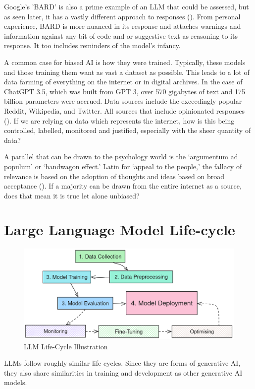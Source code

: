 \documentclass[12pt]{article}
\begin{document}
Google’s 'BARD' is also a prime example of an LLM that could be assessed, but as seen later, it has a vastly different approach to responses (\cite{pichai-2023}). From personal experience, BARD is more nuanced in its response and attaches warnings and information against any bit of code and or suggestive text as reasoning to its response. It too includes reminders of the model's infancy.

A common case for biased AI is how they were trained. Typically, these models and those training them want as vast a dataset as possible. This leads to a lot of data farming of everything on the internet or in digital archives. In the case of ChatGPT 3.5, which was built from GPT 3, over 570 gigabytes of text and 175 billion parameters were accrued. Data sources include the exceedingly popular Reddit, Wikipedia, and Twitter. All sources that include opinionated responses (\cite{gupta-2023}). If we are relying on data which represents the internet, how is this being controlled, labelled, monitored and justified, especially with the sheer quantity of data?

A parallel that can be drawn to the psychology world is the ‘argumentum ad populum’ or ‘bandwagon effect.’ Latin for ‘appeal to the people,’ the fallacy of relevance is based on the adoption of thoughts and ideas based on broad acceptance (\cite{ayala-2021}). If a majority can be drawn from the entire internet as a source, does that mean it is true let alone unbiased?

\newpage

\section{Large Language Model Life-cycle}

\begin{figure}[H]
    \centering
    \includegraphics[width=0.7\linewidth]{Images/LLM-LifeCycle(1).png}
    \caption{LLM Life-Cycle Illustration}
    \label{fig: LLM-LifeCycle}
\end{figure}

LLMs follow roughly similar life cycles. Since they are forms of generative AI, they also share similarities in training and development as other generative AI models. 
\end{document}
